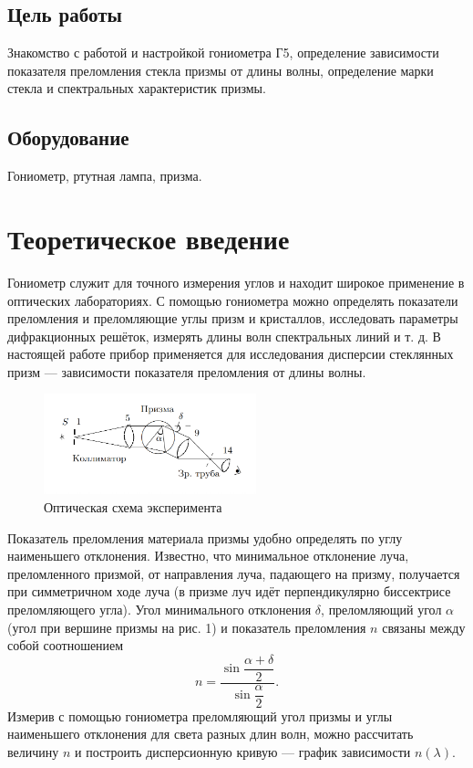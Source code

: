 \subsection{Цель работы} 

Знакомство с работой и настройкой гониометра Г5, определение зависимости показателя преломления стекла призмы от длины волны, определение марки стекла и спектральных характеристик призмы.
	
\subsection{Оборудование}

Гониометр, ртутная лампа, призма.

\section{Теоретическое введение}

Гониометр служит для точного измерения углов и находит широкое применение в оптических лабораториях. С помощью гониометра можно определять показатели преломления и преломляющие углы призм и кристаллов, исследовать параметры дифракционных решёток, измерять длины волн спектральных линий и т. д. В настоящей работе прибор применяется для исследования дисперсии стеклянных призм --- зависимости показателя преломления от длины волны.

	\begin{figure}[h]
		\begin{center}
			\includegraphics[width = 0.55\textwidth]{exp.png}
			\caption{Оптическая схема эксперимента}
		\end{center}
	\end{figure}
	
	Показатель преломления материала призмы удобно определять по углу наименьшего отклонения. Известно, что минимальное отклонение луча, преломленного призмой, от направления луча, падающего на призму, получается при симметричном ходе луча (в призме луч идёт перпендикулярно биссектрисе преломляющего угла). Угол минимального отклонения $\delta$, преломляющий угол $\alpha$ (угол при вершине призмы на рис. 1) и показатель преломления $n$ связаны между собой соотношением
	\begin{equation}
	n=\dfrac{\sin\dfrac{\alpha+\delta}{2}}{\sin\dfrac{\alpha}{2}}.
	\end{equation}
	Измерив с помощью гониометра преломляющий угол призмы и углы наименьшего отклонения для света разных длин волн, можно рассчитать величину $n$ и построить дисперсионную кривую --- график зависимости $n(\lambda)$. 
	
